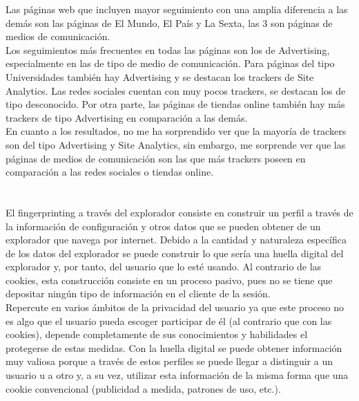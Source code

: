 \documentclass[10pt,a4paper]{article}
\begin{document}
\vspace{1cm}

Las páginas web que incluyen mayor seguimiento con una amplia diferencia a las demás son las páginas de El Mundo, El País y La Sexta, las 3 son páginas de medios de comunicación.\\

Los seguimientos más frecuentes en todas las páginas son los de Advertising, especialmente en las de tipo de medio de comunicación. Para páginas del tipo Universidades también hay Advertising y se destacan los trackers de Site Analytics. Las redes sociales cuentan con muy pocos trackers, se destacan los de tipo desconocido. Por otra parte, las páginas de tiendas online también hay más trackers de tipo Advertising en comparación a las demás.\\

En cuanto a los resultados, no me ha sorprendido ver que la mayoría de trackers son del tipo Advertising y Site Analytics, sin embargo, me sorprende ver que las páginas de medios de comunicación son las que más trackers poseen en comparación a las redes sociales o tiendas online.

\section{}
\subsection{}
El fingerprinting a través del explorador consiste en construir un perfil a través de la información de configuración y otros datos que se pueden obtener de un explorador que navega por internet. Debido a la cantidad y naturaleza específica de los datos del explorador se puede construir lo que sería una huella digital del explorador y, por tanto, del usuario que lo esté usando. Al contrario de las cookies, esta construcción consiste en un proceso pasivo, pues no se tiene que depositar ningún tipo de información en el cliente de la sesión.\\

Repercute en varios ámbitos de la privacidad del usuario ya que este proceso no es algo que el usuario pueda escoger participar de él (al contrario que con las cookies), depende completamente de sus conocimientos y habilidades el protegerse de estas medidas. Con la huella digital se puede obtener información muy valiosa porque a través de estos perfiles se puede llegar a distinguir a un usuario u a otro y, a su vez, utilizar esta información de la misma forma que una cookie convencional (publicidad a medida, patrones de uso, etc.).
\end{document}
